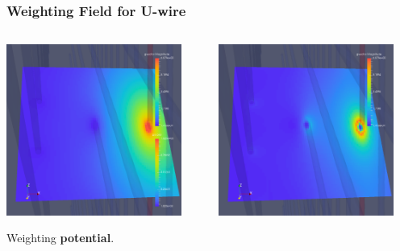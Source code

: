 \documentclass[xcolor=dvipsnames]{beamer}
\begin{document}
\begin{frame}
  \frametitle{Weighting Field for U-wire}

  \footnotesize
  \begin{columns}
    \begin{column}{0.5\textwidth}
      \begin{center}
        \includegraphics[width=0.9\textwidth,clip,trim=0cm 0cm 0cm 0cm]{steps/uweight4.png}
        
        Weighting \textbf{potential}.
      \end{center}      
    \end{column}
    \begin{column}{0.5\textwidth}
      \begin{center}
        \includegraphics[width=0.9\textwidth,clip,trim=0cm 0cm 0cm 0cm]{steps/uweight2.png}%
        

\end{center}
\end{column}
\end{columns}
\end{frame}
\end{document}
